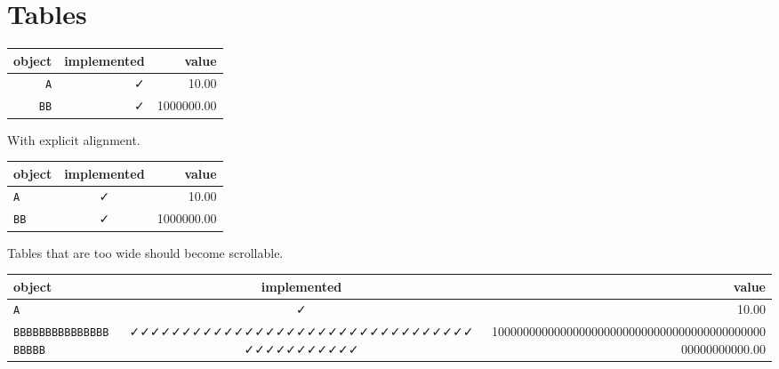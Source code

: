 \section{Tables}



\label{6147076236960597988}{}



\begin{table}[h]

\begin{tabulary}{\linewidth}{|R|R|R|}
\hline
object & implemented & value \\
\hline
\texttt{A} & ✓ & 10.00 \\
\hline
\texttt{BB} & ✓ & 1000000.00 \\
\hline
\end{tabulary}

\end{table}



With explicit alignment.




\begin{table}[h]

\begin{tabulary}{\linewidth}{|L|C|R|}
\hline
object & implemented & value \\
\hline
\texttt{A} & ✓ & 10.00 \\
\hline
\texttt{BB} & ✓ & 1000000.00 \\
\hline
\end{tabulary}

\end{table}



Tables that are too wide should become scrollable.




\begin{table}[h]

\begin{tabulary}{\linewidth}{|L|C|R|}
\hline
object & implemented & value \\
\hline
\texttt{A} & ✓ & 10.00 \\
\hline
\texttt{BBBBBBBBBBBBBBBBBBBB} & ✓✓✓✓✓✓✓✓✓✓✓✓✓✓✓✓✓✓✓✓✓✓✓✓✓✓✓✓✓✓✓✓✓✓✓✓✓✓✓✓✓✓✓✓ & 1000000000000000000000000000000000000000000000000000000.00 \\
\hline
\end{tabulary}

\end{table}



